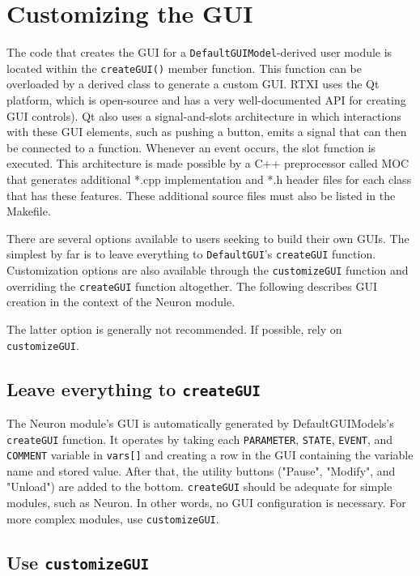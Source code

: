 \section{Customizing the GUI}
\label{Qtmodules}

The code that creates the GUI for a \texttt{DefaultGUIModel}-derived user module is located within the \texttt{createGUI()} member function. This function can be overloaded by a derived class to generate a custom GUI. RTXI uses the Qt platform, which is open-source and has a very well-documented API for creating GUI controls). Qt also uses a signal-and-slots architecture in which interactions with these GUI elements, such as pushing a button, emits a signal that can then be connected to a function. Whenever an event occurs, the slot function is executed. This architecture is made possible by a C++ preprocessor called MOC that generates additional *.cpp implementation and *.h header files for each class that has these features. These additional source files must also be listed in the Makefile.

There are several options available to users seeking to build their own GUIs. The simplest by far is to leave everything to \texttt{DefaultGUI}'s \texttt{createGUI} function. Customization options are also available through the \texttt{customizeGUI} function and overriding the \texttt{createGUI} function altogether. The following describes GUI creation in the context of the Neuron module. 

\attention The latter option is generally not recommended. If possible, rely on \texttt{customizeGUI}. 

\subsection{Leave everything to \texttt{createGUI}}
The Neuron module's GUI is automatically generated by DefaultGUIModels's \texttt{createGUI} function. It operates by taking each \texttt{PARAMETER},  \texttt{STATE}, \texttt{EVENT}, and \texttt{COMMENT} variable in \texttt{vars[]} and creating a row in the GUI containing the variable name and stored value. After that, the utility buttons ("Pause", "Modify", and "Unload") are added to the bottom. \texttt{createGUI} should be adequate for simple modules, such as Neuron. In other words, no GUI configuration is necessary. For more complex modules, use \texttt{customizeGUI}. 

\subsection{Use \texttt{customizeGUI}}

